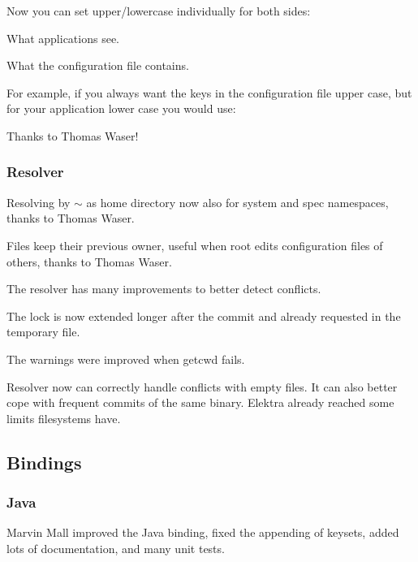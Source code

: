 Now you can set upper/lowercase individually for both sides\+:


\begin{DoxyEnumerate}
\item What applications see.
\item What the configuration file contains.
\end{DoxyEnumerate}

For example, if you always want the keys in the configuration file upper case, but for your application lower case you would use\+:




Thanks to Thomas Waser!

\subsubsection*{Resolver}

Resolving by $\sim$ as home directory now also for system and spec namespaces, thanks to Thomas Waser.

Files keep their previous owner, useful when root edits configuration files of others, thanks to Thomas Waser.

The resolver has many improvements to better detect conflicts.

The lock is now extended longer after the commit and already requested in the temporary file.

The warnings were improved when {\ttfamily getcwd} fails.

Resolver now can correctly handle conflicts with empty files. It can also better cope with frequent commits of the same binary. Elektra already reached some limits filesystems have.

\subsection*{Bindings}

\subsubsection*{Java}

Marvin Mall improved the Java binding, fixed the appending of keysets, added lots of documentation, and many unit tests.

